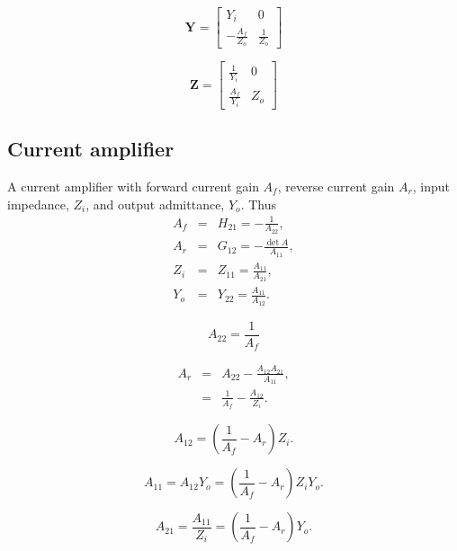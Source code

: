\documentclass[a4paper, 12pt]{article}
\newcommand{\mat}[1]{\mathbf{#1}}
\newcommand{\encp}[1]{\left(#1\right)}
\begin{document}
\begin{equation}
\mat{Y} = \left[\begin{matrix}Y_{i} & 0\\- \frac{A_{f}}{Z_{o}} & \frac{1}{Z_{o}}\end{matrix}\right]
\end{equation}

\begin{equation}
\mat{Z} = \left[\begin{matrix}\frac{1}{Y_{i}} & 0\\\frac{A_{f}}{Y_{i}} & Z_{o}\end{matrix}\right]
\end{equation}


\subsection{Current amplifier}

A current amplifier with forward current gain $A_f$, reverse current
gain $A_r$, input impedance, $Z_i$, and output admittance, $Y_o$.
Thus
%
\begin{eqnarray}
A_f & = &  H_{21} = -\frac{1}{A_{22}}, \\
A_r & = &  G_{12} = -\frac{\det{A}}{A_{11}}, \\
Z_i & = &  Z_{11} = \frac{A_{11}}{A_{21}}, \\
Y_o & = &  Y_{22} = \frac{A_{11}}{A_{12}}.
\end{eqnarray}

\begin{equation}
  A_{22} = \frac{1}{A_f}
\end{equation}

\begin{eqnarray}
  A_r & = & A_{22} - \frac{A_{12} A_{21}}{A_{11}}, \\
      & = & \frac{1}{A_f} - \frac{A_{12}}{Z_i}.
\end{eqnarray}

\begin{equation}
  A_{12} = \encp{\frac{1}{A_f} - A_r} Z_i.
\end{equation}

\begin{equation}
  A_{11} = A_{12} Y_o = \encp{\frac{1}{A_f} - A_r} Z_i Y_o.
\end{equation}

\begin{equation}
  A_{21} = \frac{A_{11}}{Z_i} = \encp{\frac{1}{A_f} - A_r} Y_o.
\end{equation}
\end{document}
